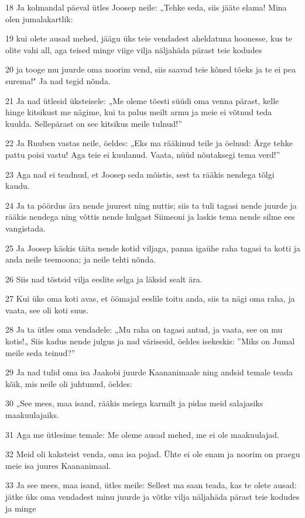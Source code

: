 \par 18 Ja kolmandal päeval ütles Joosep neile: „Tehke seda, siis jääte elama! Mina olen jumalakartlik:
\par 19 kui olete ausad mehed, jäägu üks teie vendadest aheldatuna hoonesse, kus te olite vahi all, aga teised minge viige vilja näljahäda pärast teie kodudes
\par 20 ja tooge mu juurde oma noorim vend, siis saavad teie kõned tõeks ja te ei pea surema!" Ja nad tegid nõnda.
\par 21 Ja nad ütlesid üksteisele: „Me oleme tõesti süüdi oma venna pärast, kelle hinge kitsikust me nägime, kui ta palus meilt armu ja meie ei võtnud teda kuulda. Sellepärast on see kitsikus meile tulnud!”
\par 22 Ja Ruuben vastas neile, öeldes: „Eks ma rääkinud teile ja öelnud: Ärge tehke pattu poisi vastu! Aga teie ei kuulanud. Vaata, nüüd nõutaksegi tema verd!”
\par 23 Aga nad ei teadnud, et Joosep seda mõistis, sest ta rääkis nendega tõlgi kaudu.
\par 24 Ja ta pöördus ära nende juurest ning nuttis; siis ta tuli tagasi nende juurde ja rääkis nendega ning võttis nende hulgast Siimeoni ja laskis tema nende silme ees vangistada.
\par 25 Ja Joosep käskis täita nende kotid viljaga, panna igaühe raha tagasi ta kotti ja anda neile teemoona; ja neile tehti nõnda.
\par 26 Siis nad tõstsid vilja eeslite selga ja läksid sealt ära.
\par 27 Kui üks oma koti avas, et öömajal eeslile toitu anda, siis ta nägi oma raha, ja vaata, see oli koti suus.
\par 28 Ja ta ütles oma vendadele: „Mu raha on tagasi antud, ja vaata, see on mu kotis!„ Siis kadus nende julgus ja nad värisesid, öeldes isekeskis: ”Miks on Jumal meile seda teinud?”
\par 29 Ja nad tulid oma isa Jaakobi juurde Kaananimaale ning andsid temale teada kõik, mis neile oli juhtunud, öeldes:
\par 30 „See mees, maa isand, rääkis meiega karmilt ja pidas meid salajasiks maakuulajaiks.
\par 31 Aga me ütlesime temale: Me oleme ausad mehed, me ei ole maakuulajad.
\par 32 Meid oli kaksteist venda, oma isa pojad. Ühte ei ole enam ja noorim on praegu meie isa juures Kaananimaal.
\par 33 Ja see mees, maa isand, ütles meile: Sellest ma saan teada, kas te olete ausad: jätke üks oma vendadest minu juurde ja võtke vilja näljahäda pärast teie kodudes ja minge
